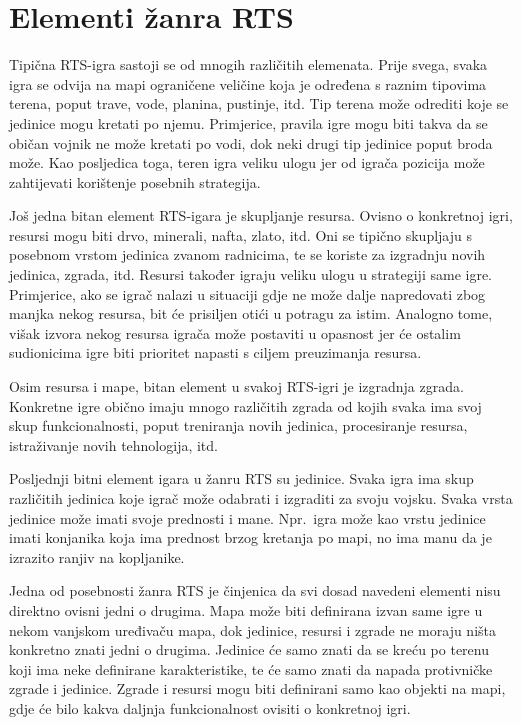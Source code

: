 \documentclass[times, utf8, zavrsni, numeric]{fer}
\begin{document}
\section{Elementi žanra RTS}

\par Tipična RTS-igra sastoji se od mnogih različitih elemenata.
Prije svega, svaka igra se odvija na mapi ograničene veličine koja je određena s raznim tipovima terena, poput trave, vode, planina, pustinje, itd. 
Tip terena može odrediti koje se jedinice mogu kretati po njemu.
Primjerice, pravila igre mogu biti takva da se običan vojnik ne može kretati po vodi, dok neki drugi tip jedinice poput broda može.
Kao posljedica toga, teren igra veliku ulogu jer od igrača pozicija može zahtijevati korištenje posebnih strategija.

\par Još jedna bitan element RTS-igara je skupljanje resursa.
Ovisno o konkretnoj igri, resursi mogu biti drvo, minerali, nafta, zlato, itd. Oni se tipično skupljaju s posebnom vrstom jedinica zvanom radnicima, te se koriste za izgradnju novih jedinica, zgrada, itd.
Resursi također igraju veliku ulogu u strategiji same igre.
Primjerice, ako se igrač nalazi u situaciji gdje ne može dalje napredovati zbog manjka nekog resursa, bit će prisiljen otići u potragu za istim.
Analogno tome, višak izvora nekog resursa igrača može postaviti u opasnost jer će ostalim sudionicima igre biti prioritet napasti s ciljem preuzimanja resursa.

\par Osim resursa i mape, bitan element u svakoj RTS-igri je izgradnja zgrada. 
Konkretne igre obično imaju mnogo različitih zgrada od kojih svaka ima svoj skup funkcionalnosti, poput treniranja novih jedinica, procesiranje resursa, istraživanje novih tehnologija, itd.  

\par Posljednji bitni element igara u žanru RTS su jedinice. 
Svaka igra ima skup različitih jedinica koje igrač može odabrati i izgraditi za svoju vojsku.
Svaka vrsta jedinice može imati svoje prednosti i mane.
Npr.\ igra može kao vrstu jedinice imati konjanika koja ima prednost brzog kretanja po mapi, no ima manu da je izrazito ranjiv na kopljanike.

\par Jedna od posebnosti žanra RTS je činjenica da svi dosad navedeni elementi nisu direktno ovisni jedni o drugima.
Mapa može biti definirana izvan same igre u nekom vanjskom uređivaču mapa, dok jedinice, resursi i zgrade ne moraju ništa konkretno znati jedni o drugima.
Jedinice će samo znati da se kreću po terenu koji ima neke definirane karakteristike, te će samo znati da napada protivničke zgrade i jedinice. 
Zgrade i resursi mogu biti definirani samo kao objekti na mapi, gdje će bilo kakva daljnja funkcionalnost ovisiti o konkretnoj igri.
\end{document}
